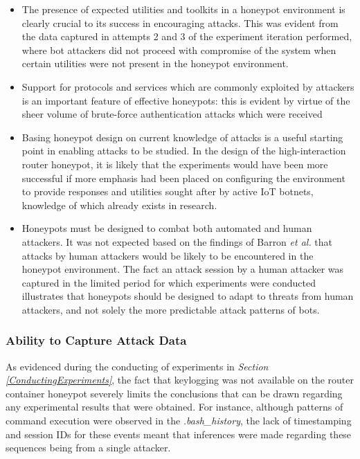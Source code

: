 \begin{itemize}
\item The presence of expected utilities and toolkits in a honeypot environment is clearly crucial to its success in encouraging attacks. This was evident from the data captured in attempts 2 and 3 of the experiment iteration performed, where bot attackers did not proceed with compromise of the system when certain utilities were not present in the honeypot environment.
\item Support for protocols and services which are commonly exploited by attackers is an important feature of effective honeypots: this is evident by virtue of the sheer volume of brute-force authentication attacks which were received
\item Basing honeypot design on current knowledge of attacks is a useful starting point in enabling attacks to be studied. In the design of the high-interaction router honeypot, it is likely that the experiments would have been more successful if more emphasis had been placed on configuring the environment to provide responses and utilities sought after by active IoT botnets, knowledge of which already exists in research. \cite{UnderstandingTheMiraiBotnet} \cite{HajimeMysteriousBotnet}
\item Honeypots must be designed to combat both automated and human attackers. It was not expected based on the findings of Barron \textit{et al.} that attacks by human attackers would be likely to be encountered in the honeypot environment. \cite{PickyAttackers2017} The fact an attack session by a human attacker was captured in the limited period for which experiments were conducted illustrates that honeypots should be designed to adapt to threats from human attackers, and not solely the more predictable attack patterns of bots. 
\end{itemize}
\subsubsection{Ability to Capture Attack Data}
As evidenced during the conducting of experiments in \textit{Section \ref{ConductingExperiments}}, the fact that keylogging was not available on the router container honeypot severely limits the conclusions that can be drawn regarding any experimental results that were obtained. For instance, although patterns of command execution were observed in the \textit{.bash\_history}, the lack of timestamping and session IDs for these events meant that inferences were made regarding these sequences being from a single attacker. 

